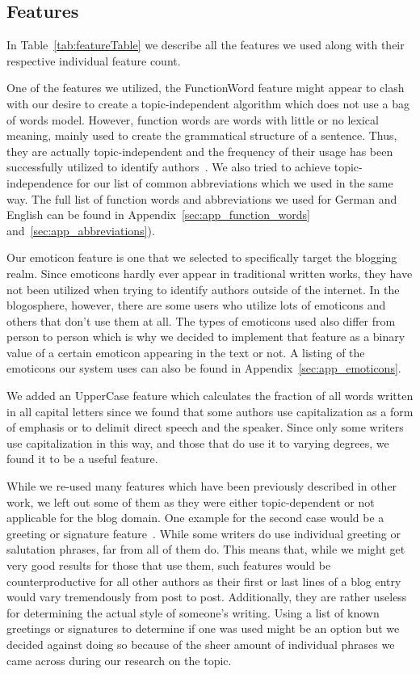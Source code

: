 \subsection{Features}
\label{sec:impl_features}

In Table~\ref{tab:featureTable} we describe all the features we used along with their respective individual feature count.


One of the features we utilized, the FunctionWord feature might appear to clash with our desire to create a topic-independent algorithm which does not use a bag of words model.
However, function words are words with little or no lexical meaning, mainly used to create the grammatical structure of a sentence.
Thus, they are actually topic-independent and the frequency of their usage has been successfully utilized to identify authors~\cite{mosteller1962applied}.
We also tried to achieve topic-independence for our list of common abbreviations which we used in the same way.
The full list of function words and abbreviations we used for German and English can be found in Appendix~\ref{sec:app_function_words} and~\ref{sec:app_abbreviations}).


Our emoticon feature is one that we selected to specifically target the blogging realm.
Since emoticons hardly ever appear in traditional written works, they have not been utilized when trying to identify authors outside of the internet.
In the blogosphere, however, there are some users who utilize lots of emoticons and others that don't use them at all.
The types of emoticons used also differ from person to person which is why we decided to implement that feature as a binary value of a certain emoticon appearing in the text or not.
A listing of the emoticons our system uses can also be found in Appendix~\ref{sec:app_emoticons}.


We added an UpperCase feature which calculates the fraction of all words written in all capital letters since we found that some authors use capitalization as a form of emphasis or to delimit direct speech and the speaker.
Since only some writers use capitalization in this way, and those that do use it to varying degrees, we found it to be a useful feature.


While we re-used many features which have been previously described in other work, we left out some of them as they were either topic-dependent or not applicable for the blog domain.
One example for the second case would be a greeting or signature feature~\cite{de2001mining}.
While some writers do use individual greeting or salutation phrases, far from all of them do.
This means that, while we might get very good results for those that use them, such features would be counterproductive for all other authors as their first or last lines of a blog entry would vary tremendously from post to post.
Additionally, they are rather useless for determining the actual style of someone's writing.
Using a list of known greetings or signatures to determine if one was used might be an option but we decided against doing so because of the sheer amount of individual phrases we came across during our research on the topic.


